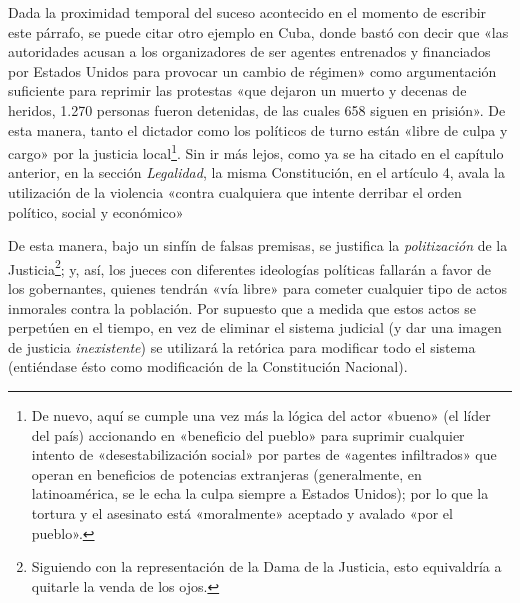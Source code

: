 \documentclass[12pt,a4paper,twoside]{book}
\begin{document}
Dada la proximidad temporal del suceso acontecido en el momento de escribir este párrafo, se puede citar otro ejemplo en Cuba, donde bastó con decir que «las autoridades acusan a los organizadores de ser agentes entrenados y financiados por Estados Unidos para provocar un cambio de régimen» \cite{cuba:15n} como argumentación suficiente para reprimir las protestas «que dejaron un muerto y decenas de heridos, 1.270 personas fueron detenidas, de las cuales 658 siguen en prisión». De esta manera, tanto el dictador como los políticos de turno están «libre de culpa y cargo» por la justicia local\footnote{De nuevo, aquí se cumple una vez más la lógica del actor «bueno» (el líder del país) accionando en «beneficio del pueblo» para suprimir cualquier intento de «desestabilización social» por partes de «agentes infiltrados» que operan en beneficios de potencias extranjeras (generalmente, en latinoamérica, se le echa la culpa siempre a Estados Unidos); por lo que la tortura y el asesinato está «moralmente» aceptado y avalado «por el pueblo».}. Sin ir más lejos, como ya se ha citado en el capítulo anterior, en la sección \textit{Legalidad}, la misma Constitución, en el artículo 4, avala la utilización de la violencia «contra cualquiera que intente derribar el orden político, social y económico» \cite[Art. 4]{cuba:constitucion}

De esta manera, bajo un sinfín de falsas premisas, se justifica la \textit{politización} de la Justicia\footnote{Siguiendo con la representación de la Dama de la Justicia, esto equivaldría a quitarle la venda de los ojos.}; y, así, los jueces con diferentes ideologías políticas fallarán a favor de los gobernantes, quienes tendrán «vía libre» para cometer cualquier tipo de actos inmorales contra la población. Por supuesto que a medida que estos actos se perpetúen en el tiempo, en vez de eliminar el sistema judicial (y dar una imagen de justicia \textit{inexistente}) se utilizará la retórica para modificar todo el sistema (entiéndase ésto como modificación de la Constitución Nacional).
\end{document}
